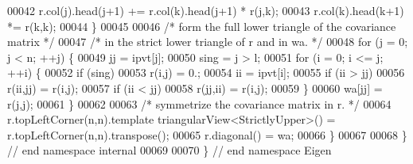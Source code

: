 \begin{DoxyCode}
00042             r.col(j).head(j+1) += r.col(k).head(j+1) * r(j,k);
00043         r.col(k).head(k+1) *= r(k,k);
00044     \}
00045 
00046     \textcolor{comment}{/* form the full lower triangle of the covariance matrix */}
00047     \textcolor{comment}{/* in the strict lower triangle of r and in wa. */}
00048     \textcolor{keywordflow}{for} (j = 0; j < n; ++j) \{
00049         jj = ipvt[j];
00050         sing = j > l;
00051         \textcolor{keywordflow}{for} (i = 0; i <= j; ++i) \{
00052             \textcolor{keywordflow}{if} (sing)
00053                 r(i,j) = 0.;
00054             ii = ipvt[i];
00055             \textcolor{keywordflow}{if} (ii > jj)
00056                 r(ii,jj) = r(i,j);
00057             \textcolor{keywordflow}{if} (ii < jj)
00058                 r(jj,ii) = r(i,j);
00059         \}
00060         wa[jj] = r(j,j);
00061     \}
00062 
00063     \textcolor{comment}{/* symmetrize the covariance matrix in r. */}
00064     r.topLeftCorner(n,n).template triangularView<StrictlyUpper>() = r.topLeftCorner(n,n).transpose();
00065     r.diagonal() = wa;
00066 \}
00067 
00068 \} \textcolor{comment}{// end namespace internal}
00069 
00070 \} \textcolor{comment}{// end namespace Eigen}
\end{DoxyCode}
